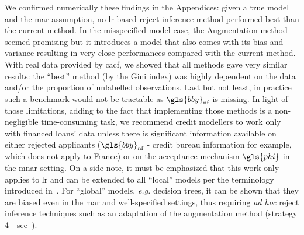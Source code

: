 We confirmed numerically these findings in the Appendices: given a true model and the \gls{mar} assumption, no \gls{lr}-based {reject inference} method performed best than the current method. In the misspecified model case, the Augmentation method seemed promising but it introduces a model that also comes with its bias and variance resulting in very close performances compared with the current method. With real data provided by \gls{cacf}, we showed that all methods gave very similar results: the ``best'' method (by the Gini index) was highly dependent on the data and/or the proportion of unlabelled observations. Last but not least, in practice such a benchmark would not be tractable as $\gls{bby}_{\text{nf}}$ is missing. In light of those limitations, adding to the fact that implementing those methods is a non-negligible time-consuming task, we recommend credit modellers to work only with financed loans' data unless there is significant information available on either rejected applicants ($\gls{bby}_{\text{nf}}$ - credit bureau information for example, which does not apply to France) or on the acceptance mechanism $\gls{phi}$ in the \gls{mnar} setting. On a side note, it must be emphasized that this work only applies to \gls{lr} and can be extended to all ``local'' models per the terminology introduced in~\cite{zadrozny2004learning}. For ``global'' models, \textit{e.g.} decision trees, it can be shown that they are biased even in the \gls{mar} and well-specified settings, thus requiring \textit{ad hoc} reject inference techniques such as an adaptation of the augmentation method (strategy 4 - see~\cite{zadrozny2004learning}).

\printbibliography[heading=subbibliography, title=References of Chapter 2]